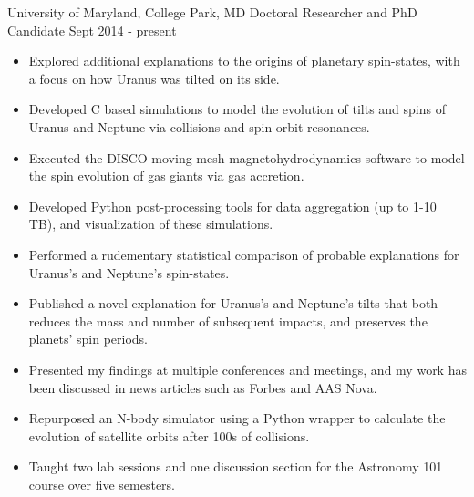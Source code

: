\documentclass[]{awesome-cv}
\begin{document}
\begin{cventries}
	\cventry
	{University of Maryland, College Park, MD}
	{Doctoral Researcher and PhD Candidate}
	{Sept 2014 - present}
	{}
	{\vspace{-3mm}
		\begin{itemize}
			\item Explored additional explanations to the origins of planetary spin-states, with a focus on how Uranus was tilted on its side. \vspace{0.7mm}
			\item Developed C based simulations to model the evolution of tilts and spins of Uranus and Neptune via collisions and spin-orbit resonances. \vspace{0.7mm}
			\item Executed the DISCO moving-mesh magnetohydrodynamics software to model the spin evolution of gas giants via gas accretion. \vspace{0.7mm} 
			\item Developed Python post-processing tools for data aggregation (up to 1-10 TB), and visualization of these simulations. \vspace{0.7mm}
			\item Performed a rudementary statistical comparison of probable explanations for Uranus's and Neptune's spin-states. \vspace{0.7mm}
			\item Published a novel explanation for Uranus's and Neptune's tilts that both reduces the mass and number of subsequent impacts, and preserves the planets' spin periods. \vspace{0.7mm}
			\item Presented my findings at multiple conferences and meetings, and my work has been discussed in news articles such as Forbes and AAS Nova. \vspace{0.7mm}
			\item Repurposed an N-body simulator using a Python wrapper to calculate the evolution of satellite orbits after 100s of collisions. \vspace{0.7mm}
			\item Taught two lab sessions and one discussion section for the Astronomy 101 course over five semesters. \vspace{0.7mm}
		\end{itemize}
	}


\end{cventries}
\end{document}
